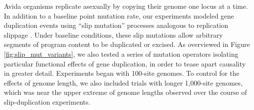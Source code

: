 Avida organisms replicate asexually by copying their genome one locus at a time.
In addition to a baseline point mutation rate, our experiments
modeled gene duplication events using ``slip mutation'' processes analogous to replication slippage \citep{bzymek_instability_2001}.
Under baseline conditions, these slip mutations allow arbitrary segments of program content to be duplicated or excised.
As overviewed in Figure \ref{fig:slip_mut_variants}, we also tested a series of mutation operators isolating particular functional effects of gene duplication, in order to tease apart causality in greater detail.
Experiments began with 100-site genomes.
To control for the effects of genome length, we also included trials with longer 1,000-site genomes, which was near the upper extreme of genome lengths observed over the course of slip-duplication experiments.



